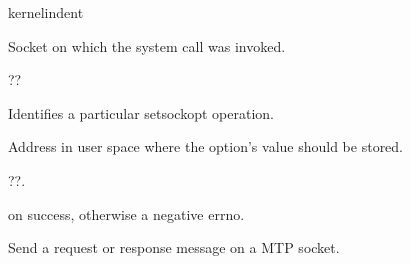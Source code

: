 \documentclass[letterpaper,10pt,english]{sphinxmanual}
\begin{document}
\begin{sphinxuseclass}{kernelindent}
\sphinxAtStartPar
{}
\begin{description}
\sphinxAtStartPar
Socket on which the system call was invoked.

\sphinxAtStartPar
??

\sphinxAtStartPar
Identifies a particular setsockopt operation.

\sphinxAtStartPar
Address in user space where the option’s value should be stored.

\sphinxAtStartPar
??.

\end{description}

\sphinxAtStartPar
{}

 on success, otherwise a negative errno.

\end{sphinxuseclass}

\begin{fulllineitems}
\label{\detokenize{mtpimpl.c:c.MTP_sendmsg}}
\pysigstartsignatures
\pysigstartmultiline
{}
\pysigstopmultiline
\pysigstopsignatures
\sphinxAtStartPar
Send a request or response message on a MTP socket.

\end{fulllineitems}
\end{document}
